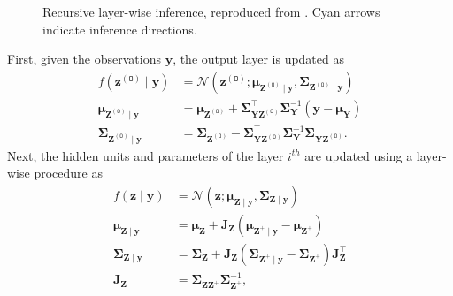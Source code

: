 \documentclass{article}
\begin{document}
\begin{figure}[htbp]
\centering
\resizebox{0.9\linewidth}{!}{}
\caption{Recursive layer-wise inference, reproduced from \cite{goulet2020tractable}.  Cyan arrows indicate inference directions.}
\label{fig:updateTAGI}
\end{figure}
%
First, given the observations $\bm{y}$, the output layer is updated as
\begin{equation*} \label{eq:z0update}
\begin{aligned}
f\left(\boldsymbol{z}^{(\mathtt{O})} \mid \boldsymbol{y}\right) &=\mathcal{N}\left(\boldsymbol{z}^{(\mathtt{O})} ; \boldsymbol{\mu}_{\boldsymbol{Z}^{(\mathtt{O})} \mid \boldsymbol{y}}, \boldsymbol{\Sigma}_{\boldsymbol{Z}^{(\mathtt{O})} \mid \boldsymbol{y}}\right) \\
\boldsymbol{\mu}_{\boldsymbol{Z}^{(\mathtt{O})} \mid \boldsymbol{y}} &=\boldsymbol{\mu}_{\boldsymbol{Z}^{(\mathtt{O})}}+\boldsymbol{\Sigma}_{\boldsymbol{Y} \boldsymbol{Z}^{(\mathtt{O})}}^{\top} \boldsymbol{\Sigma}_{\boldsymbol{Y}}^{-1}\left(\boldsymbol{y}-\boldsymbol{\mu}_{\boldsymbol{Y}}\right) \\
\boldsymbol{\Sigma}_{\boldsymbol{Z}^{(\mathtt{O})} \mid \boldsymbol{y}} &=\boldsymbol{\Sigma}_{\boldsymbol{Z}^{(\mathtt{O})}}-\boldsymbol{\Sigma}_{\boldsymbol{Y} \boldsymbol{Z}^{(\mathtt{O})}}^{\top} \boldsymbol{\Sigma}_{\boldsymbol{Y}}^{-1} \boldsymbol{\Sigma}_{\boldsymbol{Y Z}^{(\mathtt{O})}}.
\end{aligned}
\end{equation*}
%
Next, the hidden units and parameters of the layer $i^{th}$ are updated using a layer-wise procedure as
\begin{equation*}  \label{eq:layerwiseupdate}
\begin{aligned}
f(\boldsymbol{z} \mid \boldsymbol{y}) &=\mathcal{N}\left(\boldsymbol{z} ; \boldsymbol{\mu}_{\boldsymbol{Z} \mid \boldsymbol{y}}, \boldsymbol{\Sigma}_{\boldsymbol{Z} \mid \boldsymbol{y}}\right) \\
\boldsymbol{\mu}_{\boldsymbol{Z} \mid \boldsymbol{y}} &=\boldsymbol{\mu}_{\boldsymbol{Z}}+\mathbf{J}_{\boldsymbol{Z}}\left(\boldsymbol{\mu}_{\boldsymbol{Z}^{+} \mid \boldsymbol{y}}-\boldsymbol{\mu}_{\boldsymbol{Z}^{+}}\right) \\
\boldsymbol{\Sigma}_{\boldsymbol{Z} \mid \boldsymbol{y}} &=\boldsymbol{\Sigma}_{\boldsymbol{Z}}+\mathbf{J}_{\boldsymbol{Z}}\left(\boldsymbol{\Sigma}_{\boldsymbol{Z}^{+} \mid \boldsymbol{y}}-\boldsymbol{\Sigma}_{\boldsymbol{Z}^{+}}\right) \mathbf{J}_{\boldsymbol{Z}}^{\top} \\
\mathbf{J}_{\boldsymbol{Z}} &=\boldsymbol{\Sigma}_{\boldsymbol{Z Z}^{+}} \boldsymbol{\Sigma}_{\boldsymbol{Z}^{+}}^{-1},
\end{aligned}
\end{equation*}
\end{document}
